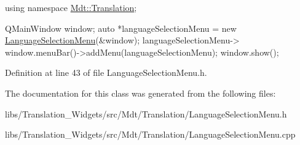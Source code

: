\begin{DoxyCode}
\textcolor{keyword}{using namespace }\hyperlink{namespace_mdt_1_1_translation}{Mdt::Translation};

QMainWindow window;
\textcolor{keyword}{auto} *languageSelectionMenu = \textcolor{keyword}{new} \hyperlink{class_mdt_1_1_translation_1_1_language_selection_menu_abdddd4c8b340d177883383de114ff63f}{LanguageSelectionMenu}(&window);
languageSelectionMenu->
window.menuBar()->addMenu(languageSelectionMenu);
window.show();
\end{DoxyCode}
 

Definition at line 43 of file Language\+Selection\+Menu.\+h.



The documentation for this class was generated from the following files\+:\begin{DoxyCompactItemize}
\item 
libs/\+Translation\+\_\+\+Widgets/src/\+Mdt/\+Translation/Language\+Selection\+Menu.\+h\item 
libs/\+Translation\+\_\+\+Widgets/src/\+Mdt/\+Translation/Language\+Selection\+Menu.\+cpp\end{DoxyCompactItemize}
